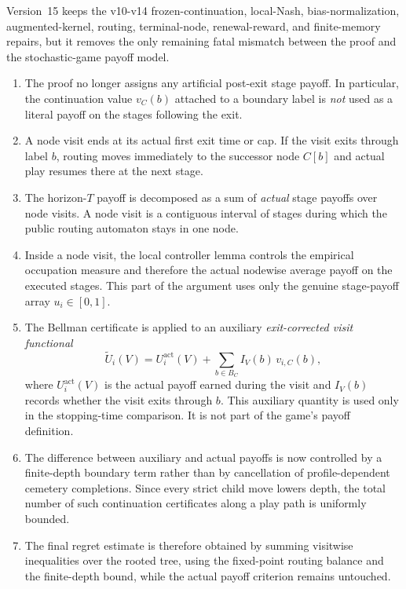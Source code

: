 \documentclass[12pt]{article}
\theoremstyle{definition}
\newcommand{\1}{\mathbf{1}}
\begin{document}
Version~15 keeps the v10-v14 frozen-continuation, local-Nash,
bias-normalization, augmented-kernel, routing, terminal-node,
renewal-reward, and finite-memory repairs, but it removes the only remaining
fatal mismatch between the proof and the stochastic-game payoff model.

\begin{enumerate}[label=\textnormal{(\arabic*)},leftmargin=2.4em]
\item The proof no longer assigns any artificial post-exit stage payoff. In
particular, the continuation value $v_C(b)$ attached to a boundary label is
\emph{not} used as a literal payoff on the stages following the exit.
\item A node visit ends at its actual first exit time or cap. If the visit exits
through label $b$, routing moves immediately to the successor node $C[b]$ and
actual play resumes there at the next stage.
\item The horizon-$T$ payoff is decomposed as a sum of \emph{actual} stage
payoffs over node visits. A node visit is a contiguous interval of stages during
which the public routing automaton stays in one node.
\item Inside a node visit, the local controller lemma controls the empirical
occupation measure and therefore the actual nodewise average payoff on the
executed stages. This part of the argument uses only the genuine stage-payoff
array $u_i\in[0,1]$.
\item The Bellman certificate is applied to an auxiliary
\emph{exit-corrected visit functional}
\[
\widetilde U_i(V)=U_i^{\mathrm{act}}(V)+\sum_{b\in B_C} I_V(b)\,v_{i,C}(b),
\]
where $U_i^{\mathrm{act}}(V)$ is the actual payoff earned during the visit and
$I_V(b)$ records whether the visit exits through $b$. This auxiliary quantity is
used only in the stopping-time comparison. It is not part of the game's payoff
definition.
\item The difference between auxiliary and actual payoffs is now controlled by a
finite-depth boundary term rather than by cancellation of profile-dependent
cemetery completions. Since every strict child move lowers depth, the total
number of such continuation certificates along a play path is uniformly bounded.
\item The final regret estimate is therefore obtained by summing visitwise
inequalities over the rooted tree, using the fixed-point routing balance and the
finite-depth bound, while the actual payoff criterion remains untouched.
\end{enumerate}
\end{document}
